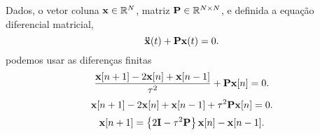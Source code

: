 \begin{myproofT}\label{proof:theo:differential-eq-discreto:order2:0}
Dados, o vetor coluna $\VECTOR{x} \in \mathbb{R}^N$, matriz $\MATRIX{P} \in \mathbb{R}^{N\times N}$, 
e definida a equação diferencial matricial,
\begin{equation}
\DDTVECTOR{x}(t) + \MATRIX{P} \VECTOR{x}(t)=0.
\end{equation}
podemos usar as diferenças finitas
\begin{equation}
\frac{\VECTOR{x}[n+1]-2\VECTOR{x}[n]+ \VECTOR{x}[n-1]}{\ToS^2} + \MATRIX{P} \VECTOR{x}[n]=0.
\end{equation}
\begin{equation}
\VECTOR{x}[n+1]-2\VECTOR{x}[n]+ \VECTOR{x}[n-1]  + \ToS^2 \MATRIX{P} \VECTOR{x}[n]=0.
\end{equation}
\begin{equation}
\VECTOR{x}[n+1]  =\left\{2\MATRIX{I}- \ToS^2 \MATRIX{P} \right\}\VECTOR{x}[n] - \VECTOR{x}[n-1].
\end{equation}
\end{myproofT}

